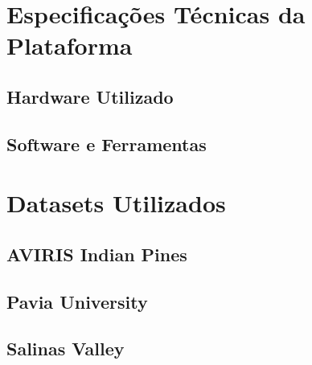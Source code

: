 
\chapter{Especificações Técnicas da Plataforma}


\section{Hardware Utilizado}


\section{Software e Ferramentas}


\chapter{Datasets Utilizados}


\section{AVIRIS Indian Pines}


\section{Pavia University}


\section{Salinas Valley}


